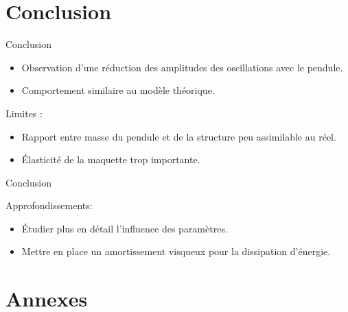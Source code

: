 \documentclass{beamer}
\begin{document}
	
\section{Conclusion}
\begin{frame}{Conclusion}
	\begin{itemize}
		\item Observation d'une réduction des amplitudes des oscillations avec le pendule.
		\item Comportement similaire au modèle théorique.\vspace{12pt}
	\end{itemize}
Limites :
	\begin{itemize}
		\item Rapport entre masse du pendule et de la structure peu assimilable au réel.
		\item Élasticité de la maquette trop importante.

	\end{itemize}
\end{frame}	

\begin{frame}{Conclusion}

Approfondissements:
	\begin{itemize}
		\item Étudier plus en détail l'influence des paramètres.
		\item Mettre en place un amortissement visqueux pour la dissipation d'énergie.
		
	\end{itemize}
\end{frame}	
	
	
\section{Annexes}
	
\end{document}
